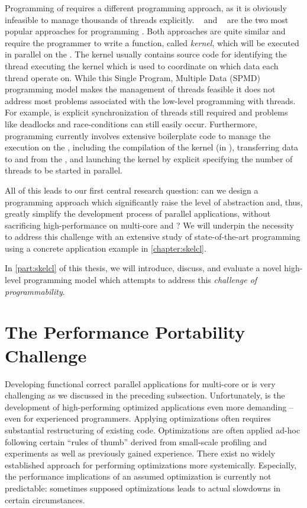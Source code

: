 Programming of \GPUs requires a different programming approach, as it is obviously infeasible to manage thousands of threads explicitly.
\CUDA~\cite{CUDAProgrammingGuide} and \OpenCL~\cite{OpenCL} are the two most popular approaches for programming \GPUs.
Both approaches are quite similar and require the programmer to write a function, called \emph{kernel}, which will be executed in parallel on the \GPU.
The kernel usually contains source code for identifying the thread executing the kernel which is used to coordinate on which data each thread operate on.
While this Single Program, Multiple Data (SPMD) programming model makes the management of threads feasible it does not address most problems associated with the low-level programming with threads.
For example, is explicit synchronization of threads still required and problems like deadlocks and race-conditions can still easily occur.
Furthermore, \GPU programming currently involves extensive boilerplate code to manage the execution on the \GPU, including the compilation of the kernel (in \OpenCL), transferring data to and from the \GPU, and launching the kernel by explicit specifying the number of threads to be started in parallel.

All of this leads to our first central research question:
can we design a programming approach which significantly raise the level of abstraction and, thus, greatly simplify the development process of parallel applications, without sacrificing high-performance on multi-core \CPUs and \GPUs?
We will underpin the necessity to address this challenge with an extensive study of state-of-the-art \GPU programming using a concrete application example in \autoref{chapter:skelcl}.

In \autoref{part:skelcl} of this thesis, we will introduce, discuss, and evaluate a novel high-level programming model which attempts to address this \emph{challenge of programmability}.

\section{The Performance Portability Challenge}

Developing functional correct parallel applications for multi-core \CPUs or \GPUs is very challenging as we discussed in the preceding subsection.
Unfortunately, is the development of high-performing optimized applications even more demanding -- even for experienced programmers.
Applying optimizations often requires substantial restructuring of existing code.
Optimizations are often applied ad-hoc following certain ``rules of thumb'' derived from small-scale profiling and experiments as well as previously gained experience.
There exist no widely established approach for performing optimizations more systemically.
Especially, the performance implications of an assumed optimization is currently not predictable:
sometimes supposed optimizations leads to actual slowdowns in certain circumstances.

